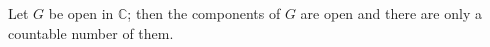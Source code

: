 Let $G$ be open in $\mathbb{C}$; then the components of $G$ are open and there are only a countable number of them.
